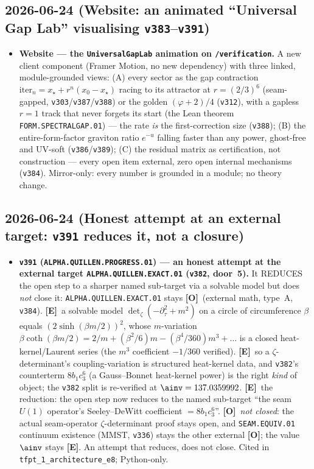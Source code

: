 \documentclass[11pt]{article}
\providecommand{\mE}{\textbf{[E]}}\providecommand{\mC}{\textbf{[C]}}
\providecommand{\mO}{\textbf{[O]}}\providecommand{\mX}{\textbf{[X]}}
\providecommand{\vref}[1]{\texttt{#1}}
\providecommand{\cthree}{c_3}\providecommand{\phiz}{\varphi_0^{\mathrm{ret}}}
\begin{document}
\subsection*{2026-06-24 (Website: an animated ``Universal Gap Lab'' visualising \texttt{v383}--\texttt{v391})}
\begin{itemize}
\item \textbf{Website --- the \texttt{UniversalGapLab} animation on \texttt{/verification}.} A new client
component (Framer Motion, no new dependency) with three linked, module-grounded views: (A) every sector as the
gap contraction $\mathrm{iter}_n=x_\star+r^n(x_0-x_\star)$ racing to its attractor at $r=(2/3)^6$ (seam-gapped,
\vref{v303}/\vref{v387}/\vref{v388}) or the golden $(\varphi+2)/4$ (\vref{v312}), with a gapless $r=1$ track that
never forgets its start (the Lean theorem \texttt{FORM.SPECTRALGAP.01}) --- the rate \emph{is} the first-correction
size (\vref{v388}); (B) the entire-form-factor graviton ratio $e^{-u}$ falling faster than any power, ghost-free and
UV-soft (\vref{v386}/\vref{v389}); (C) the residual matrix as certification, not construction --- every open item
external, zero open internal mechanisms (\vref{v384}). Mirror-only: every number is grounded in a module; no theory
change.
\end{itemize}

\subsection*{2026-06-24 (Honest attempt at an external target: \texttt{v391} reduces it, not a closure)}
\begin{itemize}
\item \textbf{\texttt{v391} (\texttt{ALPHA.QUILLEN.PROGRESS.01}) --- an honest attempt at the external target
\texttt{ALPHA.QUILLEN.EXACT.01} (\vref{v382}, door~5).} It REDUCES the open step to a sharper named sub-target via a
solvable model but does \emph{not} close it: \texttt{ALPHA.QUILLEN.EXACT.01} stays \mO\ (external math, type~A,
\vref{v384}). \mE\ a solvable model $\det_\zeta(-\partial_\tau^2+m^2)$ on a circle of circumference $\beta$ equals
$(2\sinh(\beta m/2))^2$, whose $m$-variation $\beta\coth(\beta m/2)=2/m+(\beta^2/6)m-(\beta^4/360)m^3+\dots$ is a closed
heat-kernel/Laurent series (the $m^3$ coefficient $-1/360$ verified). \mE\ so a $\zeta$-determinant's coupling-variation
is structured heat-kernel data, and \vref{v382}'s counterterm $8b_1\cthree^6$ (a Gauss--Bonnet heat-kernel power) is the
right \emph{kind} of object; the \vref{v382} split is re-verified at $\ainv=137.0359992$. \mE\ the reduction: the open
step now reduces to the named sub-target ``the seam $U(1)$ operator's Seeley--DeWitt coefficient $=8b_1\cthree^6$''.
\mO\ \emph{not closed}: the actual seam-operator $\zeta$-determinant proof stays open, and \texttt{SEAM.EQUIV.01}
continuum existence (MMST, \vref{v336}) stays the other external \mO; the value $\ainv$ stays \mE. An attempt that
reduces, does not close. Cited in \texttt{tfpt\_1\_architecture\_e8}; Python-only.
\end{itemize}
\end{document}
